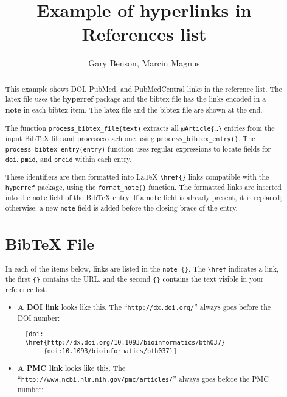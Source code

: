 \documentclass[11pt]{article}
\begin{document}
\title{Example of hyperlinks in References list}
\author{Gary Benson, Marcin Magnus}
\maketitle
\begin{abstract}
This example shows DOI, PubMed, and PubMedCentral links in the reference list.
The latex file uses the {\bf hyperref} package and the bibtex file has the links
encoded in a {\bf note} in each bibtex item. The latex file and the bibtex file
are shown at the end.

The function \texttt{process\_bibtex\_file(text)} extracts all \texttt{@Article\{\ldots\}} entries from the input BibTeX file and processes each one using \texttt{process\_bibtex\_entry()}. The \texttt{process\_bibtex\_entry(entry)} function uses regular expressions to locate fields for \texttt{doi}, \texttt{pmid}, and \texttt{pmcid} within each entry.

These identifiers are then formatted into LaTeX \texttt{\textbackslash href\{\}} links compatible with the \texttt{hyperref} package, using the \texttt{format\_note()} function. The formatted links are inserted into the \texttt{note} field of the BibTeX entry. If a \texttt{note} field is already present, it is replaced; otherwise, a new \texttt{note} field is added before the closing brace of the entry.

\section*{BibTeX File}

In each of the items below, links are listed in the \texttt{note=\{\}}. The \texttt{\textbackslash href} indicates a link, the first \texttt{\{\}} contains the URL, and the second \texttt{\{\}} contains the text visible in your reference list.

\begin{itemize}
  \item \textbf{A DOI link} looks like this. The ``\texttt{http://dx.doi.org/}'' always goes before the DOI number:
  
  \begin{verbatim}
  [doi:
  \href{http://dx.doi.org/10.1093/bioinformatics/bth037}
       {doi:10.1093/bioinformatics/bth037}]
  \end{verbatim}

  \item \textbf{A PMC link} looks like this. The ``\texttt{http://www.ncbi.nlm.nih.gov/pmc/articles/}'' always goes before the PMC number:


\end{itemize}
\end{abstract}
\end{document}
